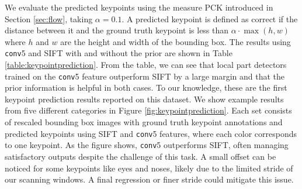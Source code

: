 \documentclass{article} \usepackage{nips14submit_e,times}
\begin{document}
We evaluate the predicted keypoints using the measure PCK introduced
in Section \ref{sec:flow}, taking $\alpha = 0.1$. A predicted keypoint is defined as correct
if the distance between it and the ground truth keypoint is less than $\alpha \cdot \max(h, w)$ where $h$
 and $w$ are the height and width of the bounding box.
The results using \texttt{conv}5 and SIFT
with and without the prior are shown in Table \ref{table:keypointprediction}. From
the table, we can see that local part detectors trained on the \texttt{conv}5 feature
outperform SIFT by a large margin and that the prior information is helpful
in both cases.
To our knowledge, these are the first keypoint prediction results reported on this
dataset.
We
show example results from five different categories in Figure
\ref{fig:keypointprediction}. Each set consists of rescaled bounding box images
with ground truth keypoint annotations and predicted keypoints using SIFT and
\texttt{conv}5 features,  where each color corresponds to one keypoint. As the
figure
shows, \texttt{conv}5 outperforms SIFT,
often managing satisfactory outputs despite the challenge of this
task. A small offset can be noticed for some keypoints like eyes and noses, likely
due to the limited
stride of our scanning windows. A final regression or finer
stride could mitigate this issue.
\end{document}
